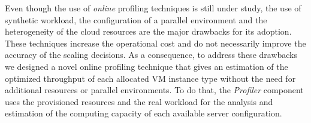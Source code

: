 Even though the use of \emph{online} profiling techniques is still under study, the use of synthetic workload, the configuration of a parallel environment and the heterogeneity of the cloud resources are the major drawbacks for its adoption. These techniques increase the operational cost and do not necessarily improve the accuracy of the scaling decisions. As a consequence, to address these drawbacks we designed a novel online profiling technique that gives an estimation of the optimized throughput of each allocated VM instance type without the need for additional resources or parallel environments. To do that, the \emph{Profiler} component uses the provisioned resources and the real workload for the analysis and estimation of the computing capacity of each available server configuration.





